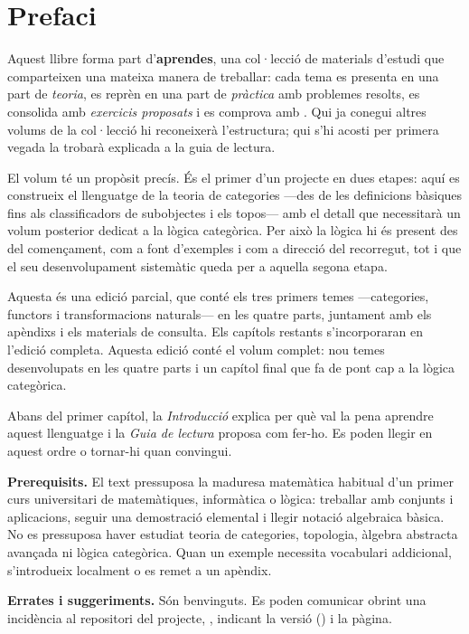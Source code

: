\chapter*{Prefaci}

Aquest llibre forma part d'\textbf{aprendes}, una col·lecció de materials
d'estudi que comparteixen una mateixa manera de treballar: cada tema es
presenta en una part de \emph{teoria}, es reprèn en una part de
\emph{pràctica} amb problemes resolts, es consolida amb \emph{exercicis
proposats} i es comprova amb \emph{\nomtests}. Qui ja conegui
altres volums de la col·lecció hi reconeixerà l'estructura; qui s'hi
acosti per primera vegada la trobarà explicada a la guia de lectura.

El volum té un propòsit precís. És el primer d'un projecte en dues
etapes: aquí es construeix el llenguatge de la teoria de categories
---des de les definicions bàsiques fins als classificadors de subobjectes
i els topos--- amb el detall que necessitarà un volum posterior dedicat
a la lògica categòrica. Per això la lògica hi és present des del
començament, com a font d'exemples i com a direcció del recorregut,
tot i que el seu desenvolupament sistemàtic queda per a aquella segona
etapa.

\ifpublicacioparcial
Aquesta és una edició parcial, que conté els tres primers temes
---categories, functors i transformacions naturals--- en les quatre parts,
juntament amb els apèndixs i els materials de consulta. Els capítols
restants s'incorporaran en l'edició completa.
\else
Aquesta edició conté el volum complet: nou temes desenvolupats en les
quatre parts i un capítol final que fa de pont cap a la lògica categòrica.
\fi

Abans del primer capítol, la \emph{Introducció} explica per què val la
pena aprendre aquest llenguatge i la \emph{Guia de lectura} proposa com
fer-ho. Es poden llegir en aquest ordre o tornar-hi quan convingui.

\medskip
\noindent\textbf{Prerequisits.} El text pressuposa la maduresa matemàtica habitual d'un primer curs universitari de matemàtiques, informàtica o lògica: treballar amb conjunts i aplicacions, seguir una demostració elemental i llegir notació algebraica bàsica. No es pressuposa haver estudiat teoria de categories, topologia, àlgebra abstracta avançada ni lògica categòrica. Quan un exemple necessita vocabulari addicional, s'introdueix localment o es remet a un apèndix.

\medskip
\noindent\textbf{Errates i suggeriments.} Són benvinguts. Es poden comunicar obrint una incidència al repositori del projecte, \llibreerrates, indicant la versió (\llibreversio) i la pàgina.

%
%

